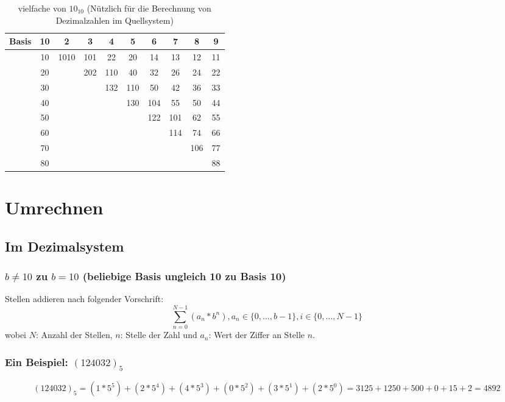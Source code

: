 \documentclass[a4paper]{article}
\begin{document}
\begin{table}[H]
\centering
\caption{vielfache von $10_{10}$ (Nützlich für die Berechnung von Dezimalzahlen im Quellsystem)}
\label{vielfacheVon10}
\begin{tabular}{cc|c|c|c|c|c|c|c|c}
Basis &10    & 2    & 3   & 4   & 5   & 6   & 7   & 8   & 9  \\\hline
      &10    & 1010 & 101 & 22  & 20  & 14  & 13  & 12  & 11 \\\hline
      &20    &      & 202 & 110 & 40  & 32  & 26  & 24  & 22 \\\hline
      &30    &      &     & 132 & 110 & 50  & 42  & 36  & 33 \\\hline
      &40    &      &     &     & 130 & 104 & 55  & 50  & 44 \\\hline
      &50    &      &     &     &     & 122 & 101 & 62  & 55 \\\hline
      &60    &      &     &     &     &     & 114 & 74  & 66 \\\hline
      &70    &      &     &     &     &     &     & 106 & 77 \\\hline
      &80    &      &     &     &     &     &     &     & 88
\end{tabular}
\end{table}

\section{Umrechnen}
\subsection{Im Dezimalsystem}
\subsubsection{\texorpdfstring{$b \neq 10$ zu $b = 10$ (beliebige Basis ungleich 10 zu Basis 10)}{b-adisch ungleich 10 zu Basis 10}}
Stellen addieren nach folgender Vorschrift:
\[
 \sum \limits_{n=0}^{N-1} (a_n * b^{n}), a_n \in \{0, \ldots , b-1\}, i \in \{0, \ldots ,N-1\}
\]
wobei $N$: Anzahl der Stellen, $n$: Stelle der Zahl und $a_n$: Wert der Ziffer an Stelle $n$.

\subsubsection{\texorpdfstring{Ein Beispiel: $(124032)_5$}{Ein Beispiel: Basis 5}}
\[
(124032)_5 = (1*5^{5})+(2*5^{4})+(4*5^{3})+(0*5^{2})+(3*5^{1})+(2*5^{0}) = 3125 + 1250 + 500 + 0 + 15 + 2 = 4892
\]
\end{document}
